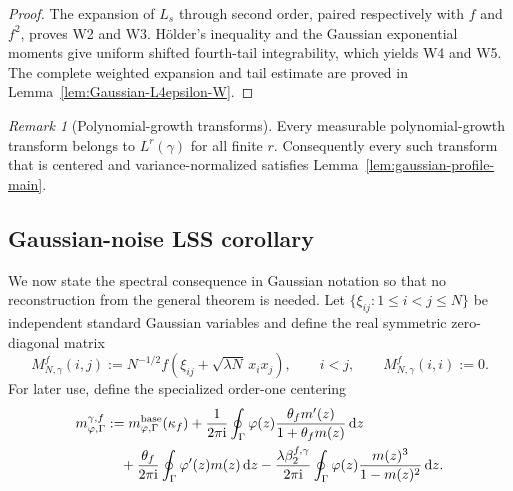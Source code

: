 \documentclass[11pt]{article}
\theoremstyle{definition}
\theoremstyle{remark}
\newtheorem{remark}[theorem]{Remark}
\newcommand{\ii}{\mathrm i}
\newcommand{\dd}{\mathrm d}
\begin{document}
\begin{proof}
The expansion of $L_s$ through second order, paired respectively with $f$ and
$f^2$, proves W2 and W3.  H\"older's inequality and the Gaussian exponential
moments give uniform shifted fourth-tail integrability, which yields W4 and
W5.  The complete weighted expansion and tail estimate are proved in
Lemma~\ref{lem:Gaussian-L4epsilon-W}.
\end{proof}

\begin{remark}[Polynomial-growth transforms]
Every measurable polynomial-growth transform belongs to $L^r(\gamma)$ for
all finite $r$.  Consequently every such transform that is centered and
variance-normalized satisfies Lemma~\ref{lem:gaussian-profile-main}.
\end{remark}

\subsection{Gaussian-noise LSS corollary}
\label{subsec:gaussian-LSS-main}

We now state the spectral consequence in Gaussian notation so that no
reconstruction from the general theorem is needed.  Let
$\{\xi_{ij}:1\le i<j\le N\}$ be independent standard Gaussian variables and
define the real symmetric zero-diagonal matrix
\begin{equation}\label{eq:Gaussian-matrix-main}
 M_{N,\gamma}^f(i,j)
 :=N^{-1/2}f\!\left(\xi_{ij}+\sqrt{\lambda N}\,x_ix_j\right),
 \qquad i<j,
 \qquad
 M_{N,\gamma}^f(i,i):=0.
\end{equation}
For later use, define the specialized order-one centering
\begin{align}
 m_{\varphi,\Gamma}^{\gamma,f}
 &:={m}_{\varphi,\Gamma}^{\rm base}(\kappa_f)
 +\frac{1}{2\pi\ii}\oint_\Gamma
 \varphi(z)\frac{\theta_fm'(z)}{1+\theta_fm(z)}\,\dd z
 \notag\\
 &\quad
 +\frac{\theta_f}{2\pi\ii}\oint_\Gamma
 \varphi'(z)m(z)\,\dd z
 -\frac{\lambda\beta_2^{f,\gamma}}{2\pi\ii}\oint_\Gamma
 \varphi(z)\frac{m(z)^3}{1-m(z)^2}\,\dd z.
 \label{eq:Gaussian-centering-main}
\end{align}
\end{document}

